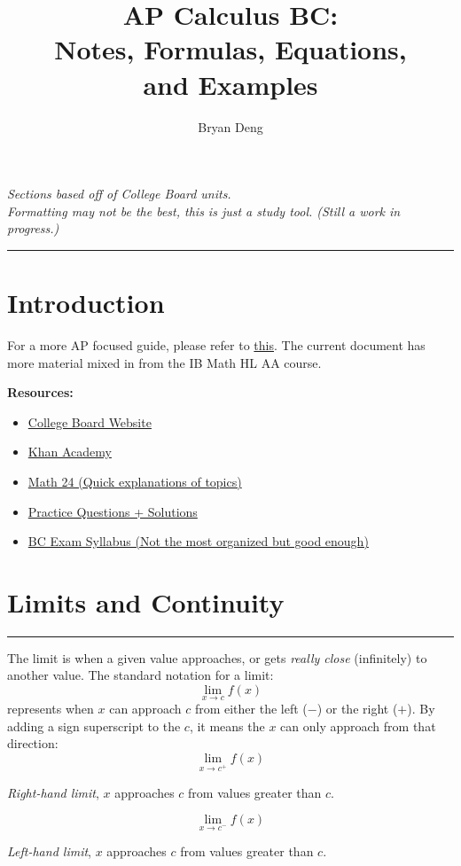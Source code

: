 \documentclass[12pt]{article}
\title{\textbf{AP Calculus BC:\\Notes, Formulas,  Equations,\\and Examples}}
\author{Bryan Deng}
\newcommand{\fline}{\par\noindent\rule{\textwidth}{0.1pt}} %
\begin{document}
\maketitle
\vfill
\begin{center}
    \textit{Sections based off of College Board units.\\
        Formatting may not be the best, this is just a study tool. (Still a work in progress.)}
\end{center}
\newpage

\tableofcontents
\fline
\newpage

\section*{Introduction}

For a more AP focused guide, please refer to \href{https://github.com/Blackgaurd/AP-CalcBC-Notes}{this}. The current document has more material mixed in from the IB Math HL AA course.

\noindent \textbf{Resources:}
\begin{itemize}
    \item \href{https://apstudents.collegeboard.org/courses/ap-calculus-bc}{College Board Website}
    \item \href{https://www.khanacademy.org/math/ap-calculus-bc}{Khan Academy}
    \item \href{https://www.math24.net/topics-calculus}{Math 24 (Quick explanations of topics)}
    \item \href{https://www.math.ucdavis.edu/~kouba/CalcOneDIRECTORY/}{Practice Questions + Solutions}
    \item \href{https://www.chelmsford.k12.ma.us/site/handlers/filedownload.ashx?moduleinstanceid=2496&dataid=7289&FileName=AP%20Calculus%20BC%20Syllabus.pdf}{BC Exam Syllabus (Not the most organized but good enough)}
\end{itemize}

\section{Limits and Continuity}
\fline

The limit is when a given value approaches, or gets \textit{really close} (infinitely) to another value. The standard notation for a limit:
\[ \lim_{x \to c} f(x) \]
represents when $x$ can approach $c$ from either the left ($-$) or the right ($+$). By adding a sign superscript to the $c$, it means the $x$ can only approach from that direction:
\[ \lim_{x \to c^+} f(x) \]
\begin{center}
    \textit{Right-hand limit}, $x$ approaches $c$ from values greater than $c$.
\end{center}
\[ \lim_{x \to c^-} f(x) \]
\begin{center}
    \textit{Left-hand limit}, $x$ approaches $c$ from values greater than $c$.
\end{center}
\end{document}
